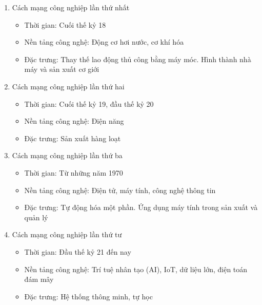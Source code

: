 \begin{enumerate}
	\item Cách mạng công nghiệp lần thứ nhất
	
	\begin{itemize}
		\item Thời gian: Cuối thế kỷ 18
		
		\item Nền tảng công nghệ: Động cơ hơi nước, cơ khí hóa
		
		\item Đặc trưng: Thay thế lao động thủ công bằng máy móc. Hình thành nhà máy và sản xuất cơ giới
	\end{itemize}
	
	\item Cách mạng công nghiệp lần thứ hai
	
	\begin{itemize}
		\item Thời gian: Cuối thế kỷ 19, đầu thế kỷ 20
		
		\item Nền tảng công nghệ: Điện năng
		
		\item Đặc trưng: Sản xuất hàng loạt
	\end{itemize}
	
	\item Cách mạng công nghiệp lần thứ ba
	
	\begin{itemize}
		\item Thời gian: Từ những năm 1970
		
		\item Nền tảng công nghệ: Điện tử, máy tính, công nghệ thông tin
		
		\item Đặc trưng: Tự động hóa một phần. Ứng dụng máy tính trong sản xuất và quản lý
	\end{itemize}
	
	\item Cách mạng công nghiệp lần thứ tư
	
	\begin{itemize}
		\item Thời gian: Đầu thế kỷ 21 đến nay
		
		\item Nền tảng công nghệ: Trí tuệ nhân tạo (AI), IoT, dữ liệu lớn, điện toán đám mây
		
		\item Đặc trưng: Hệ thống thông minh, tự học
	\end{itemize}
\end{enumerate}

